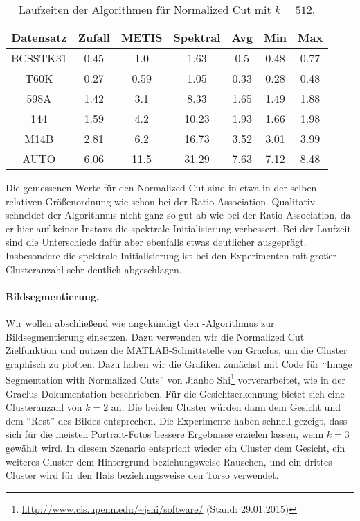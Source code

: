 \begin{table}[h!]
\centering
\begin{tabular}{@{}ccccccc@{}} \toprule
	\textbf{Datensatz} & \textbf{Zufall} & \textbf{METIS} & \textbf{Spektral} & \textbf{Avg} & \textbf{Min} & \textbf{Max} \\ \midrule
	BCSSTK31 	& 0.45 & 1.0 & 1.63 & 0.5 & 0.48 & 0.77 \\
	T60K 		& 0.27 & 0.59 & 1.05 & 0.33 & 0.28 & 0.48 \\
	598A 		& 1.42 & 3.1 & 8.33 & 1.65 & 1.49 & 1.88 \\
	144 		& 1.59 & 4.2 & 10.23 & 1.93 & 1.66 & 1.98 \\
	M14B 		& 2.81 & 6.2 & 16.73 & 3.52 & 3.01 & 3.99 \\
	AUTO 		& 6.06 & 11.5 & 31.29 & 7.63 & 7.12 & 8.48 \\
	\bottomrule
\end{tabular}
\caption{Laufzeiten der Algorithmen für Normalized Cut mit $k = 512$.}
\label{tbl:experiment-experiment-kkmpp-ncut-runtime-512}
\end{table}

Die gemessenen Werte für den Normalized Cut sind in etwa in der selben relativen Größenordnung wie schon bei der 
Ratio Association. Qualitativ schneidet der Algorithmus \kkmpp{} nicht ganz so gut ab wie bei der Ratio Association, da
er hier auf keiner Instanz die spektrale Initialisierung verbessert. Bei der Laufzeit sind die Unterschiede dafür aber ebenfalls
etwas deutlicher ausgeprägt. Insbesondere die spektrale Initialisierung ist bei den Experimenten mit großer Clusteranzahl
sehr deutlich abgeschlagen.
\paragraph{Bildsegmentierung.} Wir wollen abschließend wie angekündigt den \kkmpp-Algorithmus zur Bildsegmentierung einsetzen.
Dazu verwenden wir die Normalized Cut Zielfunktion und nutzen die MATLAB-Schnittstelle von Graclus, um die Cluster
graphisch zu plotten. Dazu haben wir die Grafiken zunächst mit Code für "`Image Segmentation with Normalized Cuts"' von
Jianbo Shi\footnote{\url{http://www.cis.upenn.edu/~jshi/software/} (Stand: 29.01.2015)} vorverarbeitet, wie in der
Graclus-Dokumentation beschrieben. Für die Gesichtserkennung bietet sich eine Clusteranzahl von $k = 2$ an. Die beiden
Cluster würden dann dem Gesicht und dem "`Rest"' des Bildes entsprechen. Die Experimente haben schnell gezeigt, dass sich für
die meisten Portrait-Fotos bessere Ergebnisse erzielen lassen, wenn $k = 3$ gewählt wird. In diesem Szenario entspricht wieder
ein Cluster dem Gesicht, ein weiteres Cluster dem Hintergrund beziehungsweise Rauschen, und ein drittes Cluster wird für
den Hals beziehungsweise den Torso verwendet.

